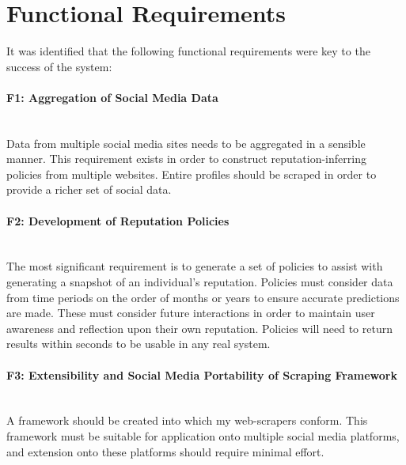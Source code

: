 \section{Functional Requirements}

It was identified that the following functional requirements were key to the success of the system:

\paragraph{F1: Aggregation of Social Media Data}\hspace{0pt} \\

\noindent Data from multiple social media sites needs to be aggregated in a sensible manner. This requirement exists in order to construct reputation-inferring policies from multiple websites. Entire profiles should be scraped in order to provide a richer set of social data.

\paragraph{F2: Development of Reputation Policies}\hspace{0pt} \\

\noindent The most significant requirement is to generate a set of policies to assist with generating a snapshot of an individual's reputation. Policies must consider data from time periods on the order of months or years to ensure accurate predictions are made. These must consider future interactions in order to maintain user awareness and reflection upon their own reputation. Policies will need to return results within seconds to be usable in any real system. 


\paragraph{ F3: Extensibility and Social Media Portability of Scraping Framework}\hspace{0pt} \\

\noindent A framework should be created into which my web-scrapers conform. This framework must be suitable for application onto multiple social media platforms, and extension onto these platforms should require minimal effort. 

